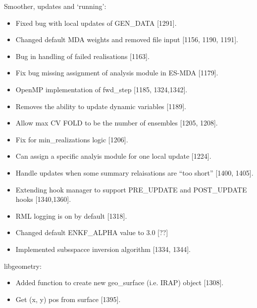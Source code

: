 \documentclass[a4paper,10pt,english]{sphinxmanual}
\begin{document}
Smoother, updates and ‘running’:
\begin{itemize}
\item {} 
Fixed bug with local updates of GEN\_DATA {[}1291{]}.

\item {} 
Changed default MDA weights and removed file input {[}1156, 1190, 1191{]}.

\item {} 
Bug in handling of failed realisations {[}1163{]}.

\item {} 
Fix bug missing assignment of analysis module in ES-MDA {[}1179{]}.

\item {} 
OpenMP implementation of fwd\_step {[}1185, 1324,1342{]}.

\item {} 
Removes the ability to update dynamic variables {[}1189{]}.

\item {} 
Allow max CV FOLD to be the number of ensembles {[}1205, 1208{]}.

\item {} 
Fix for min\_realizations logic {[}1206{]}.

\item {} 
Can assign a specific analyis module for one local update {[}1224{]}.

\item {} 
Handle updates when some summary relaisations are “too short” {[}1400, 1405{]}.

\item {} 
Extending hook manager to support PRE\_UPDATE and POST\_UPDATE hooks {[}1340,1360{]}.

\item {} 
RML logging is on by default {[}1318{]}.

\item {} 
Changed default ENKF\_ALPHA value to 3.0 {[}??{]}

\item {} 
Implemented subsspacce inversion algorithm {[}1334, 1344{]}.

\end{itemize}

libgeometry:
\begin{itemize}
\item {} 
Added function to create new geo\_surface (i.e. IRAP) object {[}1308{]}.

\item {} 
Get (x, y) pos from surface {[}1395{]}.

\end{itemize}
\end{document}
